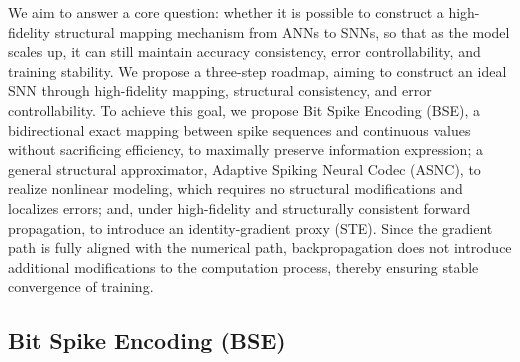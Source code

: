 \documentclass{article}
\theoremstyle{plain}
\theoremstyle{definition}
\theoremstyle{remark}
\begin{document}
We aim to answer a core question: whether it is possible to construct a high-fidelity structural mapping mechanism from ANNs to SNNs, so that as the model scales up, it can still maintain accuracy consistency, error controllability, and training stability. We propose a three-step roadmap, aiming to construct an ideal SNN through high-fidelity mapping, structural consistency, and error controllability. To achieve this goal, we propose Bit Spike Encoding (BSE), a bidirectional exact mapping between spike sequences and continuous values without sacrificing efficiency, to maximally preserve information expression; a general structural approximator, Adaptive Spiking Neural Codec (ASNC), to realize nonlinear modeling, which requires no structural modifications and localizes errors; and, under high-fidelity and structurally consistent forward propagation, to introduce an identity-gradient proxy (STE). Since the gradient path is fully aligned with the numerical path, backpropagation does not introduce additional modifications to the computation process, thereby ensuring stable convergence of training.


\subsection{Bit Spike Encoding (BSE)}
\label{subsec:bse}
\end{document}
